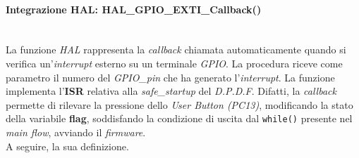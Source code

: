 \paragraph{Integrazione HAL: HAL\_GPIO\_EXTI\_Callback()}\mbox{}\\
La funzione \textit{HAL} rappresenta la \textit{callback} chiamata automaticamente quando si verifica un'\textit{interrupt} esterno su un terminale \textit{GPIO}. La procedura riceve
come parametro il numero del \textit{GPIO\_pin} che ha generato l'\textit{interrupt}.
La funzione implementa l'\textbf{ISR} relativa alla \textit{safe\_startup} del \textit{D.P.D.F}. Difatti, la \textit{callback} permette di rilevare la pressione dello \textit{User Button (PC13)}, modificando la stato della variabile \textbf{flag}, soddisfando la condizione di uscita dal \texttt{while()} presente nel \textit{main flow}, avviando il \textit{firmware}.\\
A seguire, la sua definizione.

